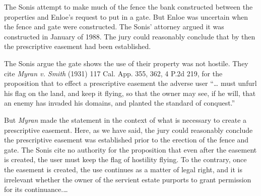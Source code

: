 The Sonis attempt to make much of the fence the bank constructed between the
properties and Enloe's request to put in a gate. But Enloe was uncertain when
the fence and gate were constructed. The Sonis' attorney argued it was
constructed in January of 1988. The jury could reasonably conclude that by then
the prescriptive easement had been established.

The Sonis argue the gate shows the use of their property was not hostile. They
cite \textit{Myran v. Smith} (1931) 117 Cal. App. 355, 362, 4 P.2d 219, for the
proposition that to effect a prescriptive easement the adverse user ``\ldots
must unfurl his flag on the land, and keep it flying, so that the owner may see,
if he will, that an enemy has invaded his domains, and planted the standard of
conquest.''

But \textit{Myran} made the statement in the context of what is necessary to
create a prescriptive easement. Here, as we have said, the jury could reasonably
conclude the prescriptive easement was established prior to the erection of the
fence and gate. The Sonis cite no authority for the proposition that even after
the easement is created, the user must keep the flag of hostility flying. To the
contrary, once the easement is created, the use continues as a matter of legal
right, and it is irrelevant whether the owner of the servient estate purports to
grant permission for its continuance.\dots

